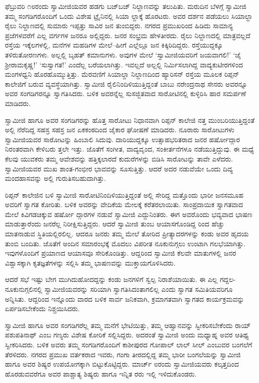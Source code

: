 ಫೆಬ್ರುವರಿ ೧೮ರಂದು ಸ್ವಾಮೀಜಿಯವರ ಹಡಗು ಬಜ್​ಬಜ್ ನಿಲ್ದಾಣವನ್ನು ತಲುಪಿತು. ಮರುದಿನ ಬೆಳಗ್ಗೆ ಸ್ವಾಮೀಜಿ ತಮ್ಮ ಸಂಗಡಿಗರೊಂದಿಗೆ ಒಂದು ವಿಶೇಷ ಟ್ರೈನಿನಲ್ಲಿ ಸಿಯಾ ಲ್ದಾಕ್ಕೆ ಹೊರಟರು. ಅವರ ದರ್ಶನ ಪಡೆಯಲು ಸಿಯಾಲ್ದಾ ರೈಲು ನಿಲ್ದಾಣದಲ್ಲಿ ಸುಮಾರು ಇಪ್ಪತ್ತು ಸಾವಿರ ಜನ ತುಂಬಿದ್ದರು. ನಗರದ ಪ್ರಮುಖರಿಂದ ಹಿಡಿದು ಸಾಮಾನ್ಯ ಪ್ರಜೆಗಳವರೆಗೆ ಎಲ್ಲ ವರ್ಗಗಳ ಜನರೂ ಅಲ್ಲಿದ್ದರು. ಜನರ ಸಂಭ್ರಮ ಹೇಳತೀರದು. ರೈಲು ನಿಲ್ದಾಣದಲ್ಲಿ ಮಾತ್ರವಲ್ಲದೆ ರಸ್ತೆಯ ಇಕ್ಕೆಲಗಳಲ್ಲಿ, ಮನೆಗಳ ಮಹಡಿಗಳ ಮೇಲೆ–ಹೀಗೆ ಎಲ್ಲೆಲ್ಲೂ ಜನ ಕಿಕ್ಕಿರಿದಿದ್ದರು. ರಸ್ತೆಯುದ್ದಕ್ಕೂ ತಳಿರುತೋರಣಗಳು. ಅಲ್ಲಲ್ಲಿ ಬೃಹತ್ ಕಮಾನುಗಳು. ಅವುಗಳ ಮೇಲೆ ‘ಸ್ವಾಮೀಜಿಯವರಿಗೆ ಜಯವಾಗಲಿ!’ ‘ಜೈ ಶ್ರೀರಾಮಕೃಷ್ಣ!’ ‘ಸುಸ್ವಾಗತ!’ ಎಂದೆಲ್ಲ ಬರೆಯಲಾಗಿತ್ತು. ಇವಲ್ಲದೆ ಅಲ್ಲಲ್ಲಿ ನಿರ್ಮಿಸಲಾಗಿದ್ದ ವಾದ್ಯಕುಟೀರಗಳಿಂದ ಮಂಗಳಧ್ವನಿ ಹೊರಹೊಮ್ಮುತ್ತಿತ್ತು. ಮೆರವಣಿಗೆ ಸಿಯಾಲ್ದಾ ನಿಲ್ದಾಣದಿಂದ ಹ್ಯಾರಿಸನ್ ರಸ್ತೆಯ ಮೂಲಕ ರಿಪ್ಪನ್ ಕಾಲೇಜಿಗೆ ಬರುವ ವ್ಯವಸ್ಥೆಯಾಗಿತ್ತು. ಸ್ವಾಮೀಜಿ ರೈಲಿನಿಂದಿಳಿಯುತ್ತಿದ್ದಂತೆ ಬಾಬು ನರೇಂದ್ರನಾಥ ಸೇನರು ಅವರನ್ನೂ ಅವರ ಸಂಗಡಿಗರನ್ನೂ ಸ್ವಾಗತಿಸಿದರು. ಬಳಿಕ ಅವರನ್ನೆಲ್ಲ ಸುಸಜ್ಜಿತವಾದ ಸಾರೋಟಿನಲ್ಲಿ ಕುಳ್ಳಿರಿಸಿ ಹಾರ ಸಮರ್ಪಣೆ ಮಾಡಿದರು.

ಸ್ವಾಮೀಜಿ ಹಾಗೂ ಅವರ ಸಂಗಡಿಗರನ್ನು ಹೊತ್ತ ಸಾರೋಟು ನಿಧಾನವಾಗಿ ರಿಪ್ಪನ್ ಕಾಲೇಜಿ ನತ್ತ ಮುಂಬರಿಯುತ್ತಿದ್ದಂತೆ ಅಲ್ಲಿ ನೆರೆದಿದ್ದ ಸಹಸ್ರ ಸಹಸ್ರ ಜನ ಏಕಕಂಠದಿಂದ ಜೈಕಾರ ಘೋಷಣೆ ಮಾಡಿದರು. ನೂರಾರು ಸಾರೋಟುಗಳು ಸ್ವಾಮೀಜಿಯವರ ಸಾರೋಟನ್ನು ಹಿಂಬಾಲಿ ಸಿದುವು. ದಾರಿಯುದ್ದಕ್ಕೂ ಉತ್ಸಾಹಭರಿತರಾದ ಜನರ ಹರ್ಷೋದ್ಗಾರ ನಿರಂತರವಾಗಿ ಕೇಳಿಬರು ತ್ತಲೇ ಇತ್ತು. ಜೊತೆಗೆ ಸಂಗೀತ, ವಾದ್ಯವೃಂದ, ಸಂಕೀರ್ತನೆಗಳೂ ನಡೆಯುತ್ತಿದ್ದುವು. ಈ ಮಧ್ಯೆ ಕೆಲವು ಯುವಕರು ತಮ್ಮ ಆವೇಶವನ್ನು ಹತ್ತಿಕ್ಕಲಾರದೆ ಕುದುರೆಗಳನ್ನು ಬಿಡಿಸಿ ಸಾರೋಟನ್ನು ತಾವೇ ಎಳೆದರು. ಸ್ವಾಮೀಜಿಯವರ ಮುಖ ಶಾಂತ-ಗಂಭೀರ ಭಾವವನ್ನು ಸೂಸುತ್ತಿತ್ತು. ಆದರೆ ಅದರ ನಡುವೆಯೇ ಒಂದು ದಿವ್ಯ ಮಂದಹಾಸವನ್ನು ಅಲ್ಲಿ ಗುರುತಿಸಬಹುದಾಗಿತ್ತು.

ರಿಪ್ಪನ್ ಕಾಲೇಜಿನ ಬಳಿ ಸ್ವಾಮೀಜಿ ಸಾರೋಟಿನಿಂದಿಳಿಯುತ್ತಿದ್ದಂತೆ ಅಲ್ಲಿ ಸೇರಿದ್ದ ಮತ್ತೊಂದು ಭಾರೀ ಜನಸಮೂಹ ಅವರಿಗೆ ಸ್ವಾಗತ ಕೋರಿತು. ಬಳಿಕ ಅವರನ್ನು ವೇದಿಕೆಯ ಮೇಲಕ್ಕೆ ಕರೆತರಲಾಯಿತು. ಸಾಂಪ್ರದಾಯಿಕ ಸ್ವಾಗತವಾದ ಮೇಲೆ ಕಿವಿಗಡಚಿಕ್ಕುವ ಹರ್ಷೋ ದ್ಗಾರಗಳ ನಡುವೆ ಸ್ವಾಮೀಜಿ ಎದ್ದುನಿಂತರು. ಈಗ ಅವರೊಂದು ಭವ್ಯವಾದ ಭಾಷಣ ಮಾಡುತ್ತಾರೆಂದು ಜನರೆಲ್ಲ ನಿರೀಕ್ಷಿಸುತ್ತಿದ್ದರು. ಆದರೆ ಸ್ವಾಮೀಜಿ ತುಂಬ ಆಯಾಸಗೊಂಡಿದ್ದ ರಿಂದ ಹೆಚ್ಚು ಮಾತನಾಡುವ ಸ್ಥಿತಿಯಲ್ಲಿರಲಿಲ್ಲ. ಆದರೂ ಜನರು ತಮ್ಮ ಮೇಲೆ ತೋರಿದ ಪ್ರೀತ್ಯಾದರಗಳನ್ನು ಕಂಡು ಅವರ ಹೃದಯ ತುಂಬಿ ಬಂದಿತು. ಜೊತೆಗೆ ಅಂದಿನ ಸಮಾರಂಭಕ್ಕೆ ಮೊದಲು ವಿಪರೀತ ನೂಕುನುಗ್ಗಲು ಉಂಟಾಗಿ ಗಲಭೆಯಾಗಿತ್ತು. ಇವುಗಳೊಂದಿಗೆ ಪ್ರಯಾಣದ ಆಯಾಸವೂ ಸೇರಿಕೊಂಡಿತ್ತು. ಆದ್ದರಿಂದ ಸ್ವಾಮೀಜಿ ಕೆಲವೇ ಮಾತುಗಳಲ್ಲಿ ಜನರ ವಿಶ್ವಾಸಕ್ಕಾಗಿ ಕೃತಜ್ಞತೆಗಳನ್ನು ಸಲ್ಲಿಸಿ ತಮ್ಮ ಭಾಷಣವನ್ನು ಮುಕ್ತಾಯಗೊಳಿಸಿದರು.

ಆದರೆ ಸಭೆ ಇಷ್ಟು ಬೇಗ ಮುಗಿದುಹೋದದ್ದನ್ನು ಕಂಡು ಜನಗಳಿಗೆ ಸ್ವಲ್ಪ ನಿರಾಶೆಯಾಯಿತು. ಈ ಎಲ್ಲ ಗದ್ದಲ-ನೂಕುನುಗ್ಗಲಿನಲ್ಲಿ ಸ್ವಾಮೀಜಿಯವರನ್ನು ಸರಿಯಾಗಿ ಸ್ವಾಗತಿಸಿದಂತಾಗಲಿಲ್ಲ ಎಂದು ಸ್ವಾಗತ ಸಮಿತಿಯವರಿಗೂ ಅನ್ನಿಸಿತು. ಆದ್ದರಿಂದ ಇನ್ನೊಂದು ವಾರದ ಬಳಿಕ ಸಾರ್ವ ಜನಿಕವಾಗಿ, ಕ್ರಮಾಗತವಾಗಿ ಸ್ವಾಗತದ ಕಾರ್ಯಕ್ರಮವನ್ನು ಏರ್ಪಡಿಸಬೇಕೆಂದು ನಿಶ್ಚಯಿಸಿದರು.

ಸ್ವಾಮೀಜಿ ಹಾಗೂ ಅವರ ಸಂಗಡಿಗರೆಲ್ಲ ತಮ್ಮ ಮನೆಗೆ ಭೇಟಿಯಿತ್ತು, ತಮ್ಮ ಆಹ್ವಾನವನ್ನು ಸ್ವೀಕರಿಸಬೇಕೆಂದು ರಾಯ್ ಪಶುಪತಿನಾಥ್ ಎಂಬ ಗಣ್ಯರು ವಿಶೇಷ ಕೋರಿಕೆ ಸಲ್ಲಿಸಿದ್ದರು. ಅದರಂತೆ ಸ್ವಾಮೀಜಿ ಅಂದು ಮಧ್ಯಾಹ್ನ ಅವರ ಆತಿಥ್ಯ ಸ್ವೀಕರಿಸಿದರು. ಬಳಿಕ ಅವರು ತಮ್ಮ ಸಂಗಡಿಗರೊಂದಿಗೆ ಕಾಶೀಪುರದ ಗೋಪಾಲ್ ಲಾಲ್ ಸೀಲ್ ಎಂಬುವರ ಬಂಗಲೆಗೆ ತೆರಳಿದರು. ನಗರದ ಪ್ರಮುಖ ವರ್ತಕರಾದ ಇವರು, ಗಂಗಾ ತೀರದಲ್ಲಿದ್ದ ತಮ್ಮ ಭಾರೀ ಬಂಗಲೆಯನ್ನು ಸ್ವಾಮೀಜಿ ಹಾಗೂ ಅವರ ಶಿಷ್ಯರ ಉಪಯೋಗಕ್ಕಾಗಿ ಬಿಟ್ಟುಕೊಟ್ಟಿದ್ದರು. ಮಾರ್ಚ್ ೮ರಂದು ಸ್ವಾಮೀಜಿಯವರು ಕಲ್ಕತ್ತದಿಂದ ಹೊರಡುವವರೆಗೂ ಅವರ ಪಾಶ್ಚಾತ್ಯ ಶಿಷ್ಯರು ಹಾಗೂ ಇನ್ನಿತ ರರು ಇಲ್ಲಿ ಇಳಿದುಕೊಂಡರು.

